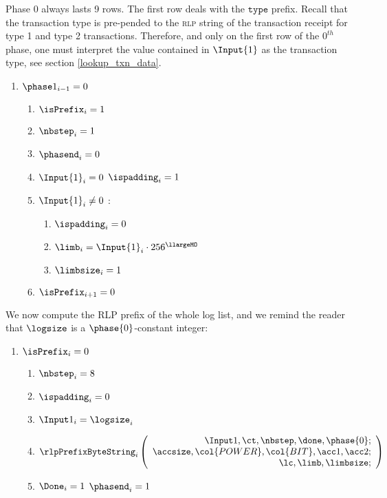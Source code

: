 \begin{center}
\end{center}

Phase 0 always lasts 9 rows.
The first row deals with the $\texttt{type}$ prefix. Recall that the transaction type is pre-pended to the \textsc{rlp} string of the transaction receipt for type 1 and type 2 transactions.
Therefore, and only on the first row of the $0^{th}$ phase, one must interpret the value contained in $\Input{1}$ as the transaction type, see section \ref{lookup_txn_data}.
\begin{enumerate}
	\item \If $\phase1_{i-1}=0$ \Then
		\begin{enumerate}
			\item $\isPrefix_{i}=1$
			\item $\nbstep_{i}=1$
			\item $\phasend_{i}=0$
			\item \If $\Input{1}_{i}=0$ \Then $\ispadding_{i}=1$
			\item \If $\Input{1}_{i} \neq 0$ \Then:
				\begin{enumerate}
					\item $\ispadding_{i}=0$
					\item $\limb_{i}=\Input{1}_{i}\cdot256^{\llargeMO}$ 
					\item $\limbsize_{i}=1$
				\end{enumerate}
			\item $\isPrefix_{i+1}=0$ 
		\end{enumerate}
\end{enumerate}
We now compute the RLP prefix of the whole log list, and we remind the reader that $\logsize$ is a $\phase{0}$-constant integer:
\begin{enumerate}[resume]
	\item \If $\isPrefix_{i}=0$ \Then
		\begin{enumerate}
			\item $\nbstep_{i}=8$
			\item $\ispadding_{i}=0$
			\item $\Input1_{i} = \logsize_{i}$
			\item 
				\[
					\rlpPrefixByteString_{i}
					\left(
					\begin{array}{r}
						\Input1,
						\ct,
						\nbstep,
						\done,
						\phase{0}; \\
						\accsize,
						\col{POWER},
						\col{BIT},
						\acc1,
						\acc2; \\
						\lc,
						\limb,
						\limbsize; \\
					\end{array}
					\right)
				\]
			\item \If $\Done_{i}=1$ \Then $\phasend_{i}=1$
		\end{enumerate}
\end{enumerate}
